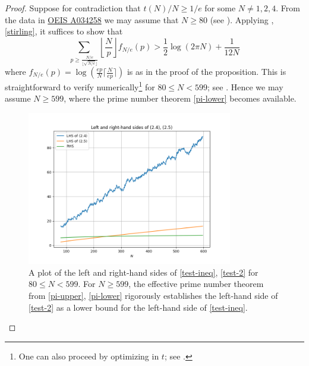 \documentclass[12pt,a4paper,reqno]{amsart}
\numberwithin{equation}{section}
\theoremstyle{plain}
\theoremstyle{definition}
\begin{document}
\begin{proof}  Suppose for contradiction that $t(N)/N \geq 1/e$ for some $N \neq 1,2,4$.
From the data in \href{https://oeis.org/A034258}{OEIS A034258} we may assume that $N \geq 80$ (see ).  Applying , \eqref{stirling}, it suffices to show that
\begin{equation}\label{test-ineq}
   \sum_{p \geq \frac{N/e}{\lfloor\sqrt{N/e}\rfloor}} \left\lfloor \frac{N}{p} \right\rfloor f_{N/e}(p) > \frac{1}{2} \log(2\pi N) + \frac{1}{12N}
\end{equation}
where $f_{N/e}(p) = \log(\frac{ep}{N} \lceil \frac{N}{ep} \rceil)$ is as in the proof of the proposition.  This is straightforward to verify numerically\footnote{One can also proceed by optimizing  in $t$; see .} for $80 \leq N < 599$; see .  Hence we may assume $N \geq 599$, where the prime number theorem \eqref{pi-lower} becomes available.

\begin{figure}
  \centering
  \includegraphics[width=0.8\textwidth]{lhs_rhs.png}
  \caption{A plot of the left and right-hand sides of \eqref{test-ineq}, \eqref{test-2} for $80 \leq N < 599$.  For $N \geq 599$, the effective prime number theorem from \eqref{pi-upper}, \eqref{pi-lower} rigorously establishes the left-hand side of \eqref{test-2} as a lower bound for the left-hand side of \eqref{test-ineq}.}\label{fig2}
\end{figure}


\end{proof}
\end{document}
